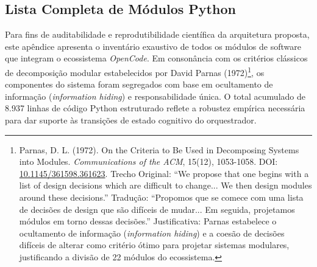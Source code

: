 \documentclass[12pt,a4paper,oneside]{abntex2}
\begin{document}
\begin{apendicesenv}

\chapter{Lista Completa de Módulos Python}

Para fins de auditabilidade e reprodutibilidade científica da arquitetura proposta, este apêndice apresenta o inventário exaustivo de todos os módulos de software que integram o ecossistema \textit{OpenCode}. Em consonância com os critérios clássicos de decomposição modular estabelecidos por David Parnas (1972)\footnote{Parnas, D. L. (1972). On the Criteria to Be Used in Decomposing Systems into Modules. \textit{Communications of the ACM}, 15(12), 1053-1058. DOI: \href{https://doi.org/10.1145/361598.361623}{10.1145/361598.361623}. Trecho Original: ``We propose that one begins with a list of design decisions which are difficult to change... We then design modules around these decisions.'' Tradução: ``Propomos que se comece com uma lista de decisões de design que são difíceis de mudar... Em seguida, projetamos módulos em torno dessas decisões.'' Justificativa: Parnas estabelece o ocultamento de informação (\textit{information hiding}) e a coesão de decisões difíceis de alterar como critério ótimo para projetar sistemas modulares, justificando a divisão de 22 módulos do ecossistema.}, os componentes do sistema foram segregados com base em ocultamento de informação (\textit{information hiding}) e responsabilidade única. O total acumulado de 8.937 linhas de código Python estruturado reflete a robustez empírica necessária para dar suporte às transições de estado cognitivo do orquestrador.


\end{apendicesenv}
\end{document}
